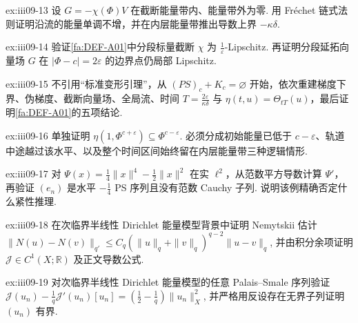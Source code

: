 \begin{FAExercise}[能量单调性]{ex:iii09-13}
设 \(\displaystyle G=-\chi(\Phi)V\) 在截断能量带内、能量带外为零. 用 Fréchet 链式法则证明沿流的能量单调不增，并在内层能量带推出导数上界 \(\displaystyle-\kappa\delta\).
\end{FAExercise}

\begin{FAExercise}[截断构造]{ex:iii09-14}
验证\autoref{fa:DEF-A01}中分段标量截断 \(\displaystyle\chi\) 为 \(\displaystyle\frac{1}{\varepsilon}\)-Lipschitz. 再证明分段延拓向量场 \(\displaystyle G\) 在 \(\displaystyle|\Phi-c|=2\varepsilon\) 的边界点仍局部 Lipschitz.
\end{FAExercise}

\begin{FAExercise}[定量变形引理]{ex:iii09-15}
不引用“标准变形引理”，从 \(\displaystyle(PS)_c+K_c=\varnothing\) 开始，依次重建梯度下界、伪梯度、截断向量场、全局流、时间 \(\displaystyle T=\frac{2\varepsilon}{\kappa\delta}\) 与 \(\displaystyle\eta(t,u)=\Theta_{tT}(u)\)，最后证明\autoref{fa:DEF-A01}的五项结论.
\end{FAExercise}

\begin{FAExercise}[子水平集下降]{ex:iii09-16}
单独证明 \(\displaystyle\eta(1,\Phi^{c+\varepsilon})\subseteq\Phi^{c-\varepsilon}\). 必须分成初始能量已低于 \(\displaystyle c-\varepsilon\)、轨道中途越过该水平、以及整个时间区间始终留在内层能量带三种逻辑情形.
\end{FAExercise}

\begin{FAExercise}{ex:iii09-17}
对 \(\displaystyle\Psi(x)=\frac{1}{4}\|x\|^4-\frac{1}{2}\|x\|^2\) 在实 \(\displaystyle\ell^2\)，从范数平方导数计算 \(\displaystyle\Psi'\)，再验证 \(\displaystyle(e_n)\) 是水平 \(\displaystyle-\frac{1}{4}\) PS 序列且没有范数 Cauchy 子列. 说明该例精确否定什么紧性推理.
\end{FAExercise}

\begin{FAExercise}{ex:iii09-18}
在次临界半线性 Dirichlet 能量模型背景中证明 Nemytskii 估计
\(\displaystyle \|N(u)-N(v)\|_{q'} \leqslant C_q(\|u\|_q+\|v\|_q)^{q-2}\|u-v\|_q\),
并由积分余项证明 \(\displaystyle\mathcal J\in C^1(X;\mathbb R)\) 及正文导数公式.
\end{FAExercise}

\begin{FAExercise}{ex:iii09-19}
对次临界半线性 Dirichlet 能量模型的任意 Palais--Smale 序列验证
\(\displaystyle \mathcal J(u_n)-\frac{1}{q}\mathcal J'(u_n)[u_n] = \left(\frac{1}{2}-\frac{1}{q}\right)\|u_n\|_X^2\),
并严格用反设存在无界子列证明 \(\displaystyle(u_n)\) 有界.
\end{FAExercise}

